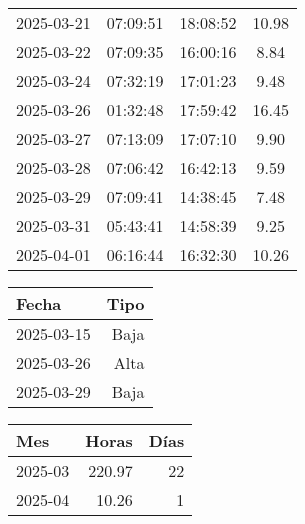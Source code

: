 \documentclass[11pt,a4paper]{article}
\newcommand{\infobox}[2]{
  \begin{tcolorbox}[
    colback=grisclaro,
    colframe=corporativo,
    title=#1,
    fonttitle=\bfseries
  ]
  #2
  \end{tcolorbox}
}
\begin{document}
\begin{minipage}[t]{0.62\textwidth}
{\begin{tabular}{lccc}
2025-03-21 & 07:09:51 & 18:08:52 & 10.98\\

2025-03-22 & 07:09:35 & 16:00:16 & 8.84\\

2025-03-24 & 07:32:19 & 17:01:23 & 9.48\\

2025-03-26 & 01:32:48 & 17:59:42 & 16.45\\

2025-03-27 & 07:13:09 & 17:07:10 & 9.90\\

2025-03-28 & 07:06:42 & 16:42:13 & 9.59\\

2025-03-29 & 07:09:41 & 14:38:45 & 7.48\\

2025-03-31 & 05:43:41 & 14:58:39 & 9.25\\

2025-04-01 & 06:16:44 & 16:32:30 & 10.26\\

\bottomrule
\end{tabular}
}
\end{minipage}
\hfill
\begin{minipage}[t]{0.35\textwidth}
\infobox{D\'ias At\'ipicos}{
\begin{tabular}{lr}
\toprule
\rowcolor{grisclaro} \textbf{Fecha} & \textbf{Tipo}\\
\midrule

2025-03-15 & Baja\\

2025-03-26 & Alta\\

2025-03-29 & Baja\\

\bottomrule
\end{tabular}
}

\vspace{1em}
\infobox{Resumen Mensual}{
\begin{tabular}{lrr}
\toprule
\rowcolor{grisclaro} \textbf{Mes} & \textbf{Horas} & \textbf{D\'ias}\\
\midrule

2025-03 & 220.97 & 22\\

2025-04 & 10.26 & 1\\

\bottomrule
\end{tabular}
}
\end{minipage}
\end{document}
